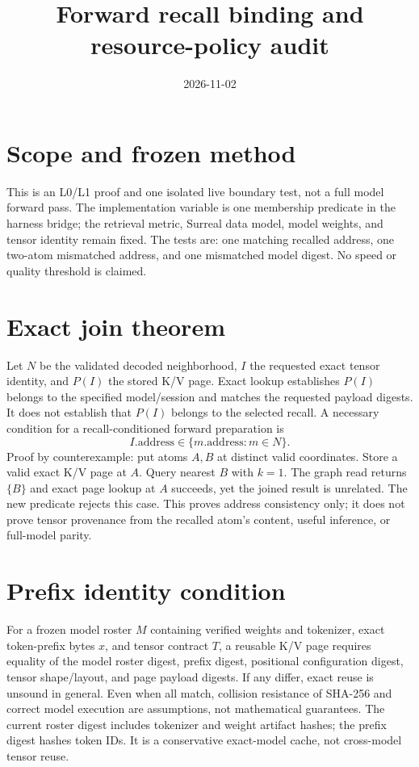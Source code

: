 \documentclass{article}
\begin{document}
\title{Forward recall binding and resource-policy audit}
\date{2026-11-02}
\maketitle
\section*{Scope and frozen method}
This is an L0/L1 proof and one isolated live boundary test, not a full model forward pass. The implementation variable is one membership predicate in the harness bridge; the retrieval metric, Surreal data model, model weights, and tensor identity remain fixed. The tests are: one matching recalled address, one two-atom mismatched address, and one mismatched model digest. No speed or quality threshold is claimed.
\section*{Exact join theorem}
Let $N$ be the validated decoded neighborhood, $I$ the requested exact tensor identity, and $P(I)$ the stored K/V page. Exact lookup establishes $P(I)$ belongs to the specified model/session and matches the requested payload digests. It does not establish that $P(I)$ belongs to the selected recall. A necessary condition for a recall-conditioned forward preparation is
\[I.\mathrm{address}\in\{m.\mathrm{address}:m\in N\}.\]
Proof by counterexample: put atoms $A,B$ at distinct valid coordinates. Store a valid exact K/V page at $A$. Query nearest $B$ with $k=1$. The graph read returns $\{B\}$ and exact page lookup at $A$ succeeds, yet the joined result is unrelated. The new predicate rejects this case. This proves address consistency only; it does not prove tensor provenance from the recalled atom's content, useful inference, or full-model parity.
\section*{Prefix identity condition}
For a frozen model roster $M$ containing verified weights and tokenizer, exact token-prefix bytes $x$, and tensor contract $T$, a reusable K/V page requires equality of the model roster digest, prefix digest, positional configuration digest, tensor shape/layout, and page payload digests. If any differ, exact reuse is unsound in general. Even when all match, collision resistance of SHA-256 and correct model execution are assumptions, not mathematical guarantees. The current roster digest includes tokenizer and weight artifact hashes; the prefix digest hashes token IDs. It is a conservative exact-model cache, not cross-model tensor reuse.
\end{document}

